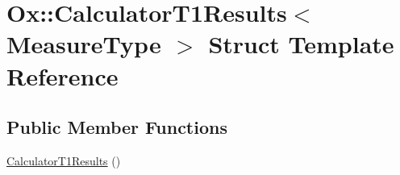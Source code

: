 \hypertarget{struct_ox_1_1_calculator_t1_results}{\section{Ox\-:\-:Calculator\-T1\-Results$<$ Measure\-Type $>$ Struct Template Reference}
\label{struct_ox_1_1_calculator_t1_results}
}
\subsection*{Public Member Functions}
\begin{DoxyCompactItemize}
\item 
\hyperlink{struct_ox_1_1_calculator_t1_results_a2ef9ec72b2f7e61bb442fe8e0f61d508}{Calculator\-T1\-Results} ()
\end{DoxyCompactItemize}
